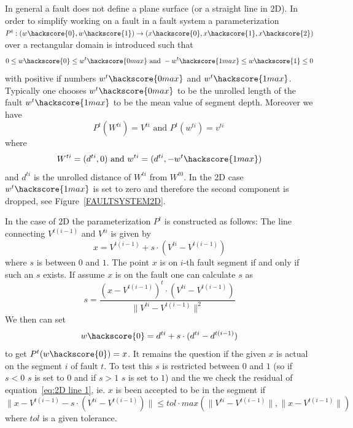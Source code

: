 In general a fault does not define a plane surface (or a straight line in 2D). In order to simplify working on 
a fault in a fault system a parameterization $P^t: (w\hackscore{0},w\hackscore{1}) \rightarrow (x\hackscore{0},x\hackscore{1},x\hackscore{2})$ over a rectangular domain is introduced such that 
\begin{equation}
0\le w\hackscore{0} \le w^t\hackscore{0 max} \mbox{ and }  -w^t\hackscore{1max}\le w\hackscore{1} \le 0
\label{eq:fault 1}
\end{equation}
with positive if numbers $w^t\hackscore{0 max}$ and $w^t\hackscore{1 max}$. Typically one chooses
$w^t\hackscore{0 max}$ to be the unrolled length of the fault
$w^t\hackscore{1 max}$ to be the mean value of segment depth. Moreover we have 
\begin{equation}
P^t(W^{ti})=V^{ti}\mbox{ and } P^t(w^{ti})=v^{ti}\
\label{eq:fault 2}
\end{equation}
where 
\begin{equation}
W^{ti}=(d^{ti},0) \mbox{ and } w^{ti}=(d^{ti},-w^t\hackscore{1 max})
\label{eq:fault 3}
\end{equation}
and $d^{ti}$ is the unrolled distance of $W^{ti}$ from $W^{t0}$. In the 2D case $w^t\hackscore{1 max}$ is set to zero and therefore the second component is dropped, see Figure~\ref{FAULTSYSTEM2D}.

In the case of 2D the parameterization $P^t$ is constructed as follows:
The line connecting $V^{t(i-1)}$ and $V^{ti}$ is given by
\begin{equation}
x=V^{t(i-1)} + s \cdot (V^{ti}-V^{t(i-1)})
\label{eq:2D line 1}
\end{equation}
where $s$ is between $0$ and $1$. The point $x$ is on $i$-th fault segment if and only if 
such an $s$ exists. If assume $x$ is on the fault one can calculate $s$ as
\begin{equation}
s = \frac{ (x- V^{t(i-1)})^t \cdot (V^{ti}-V^{t(i-1)}) }{\|V^{ti}-V^{t(i-1)}\|^2} 
\label{eq:2D line 1b}
\end{equation}
We then can set
\begin{equation}
w\hackscore{0}=d^{ti}+s \cdot (d^{ti}-d^{t(i-1)})
\label{eq:2D line 2}
\end{equation}
to get $P^t(w\hackscore{0})=x$.
It remains the question if the given $x$ is actual on the segment $i$ of fault $t$. To test this $s$ is restricted 
between $0$ and $1$ (so if $s<0$ $s$ is set to $0$ and if $s>1$ $s$ is set to $1$) and the we check the 
residual of equation~\ref{eq:2D line 1}, ie. $x$ is been accepted to be in the segment if
\begin{equation}
\|x-V^{t(i-1)} - s \cdot (V^{ti}-V^{t(i-1)}) \| \le tol \cdot max(\|V^{ti}-V^{t(i-1)}\|, \|x-V^{t(i-1)} \|) 
\label{eq:2D line 3}
\end{equation}
where $tol$ is a given tolerance.

